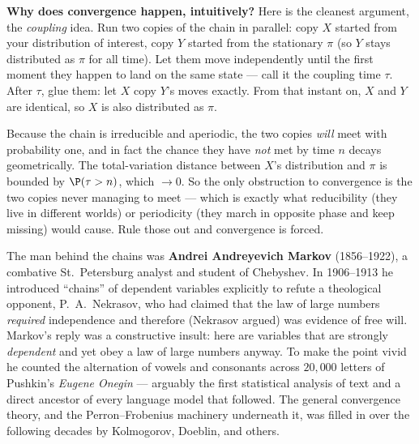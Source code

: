 \begin{whybox}
\textbf{Why does convergence happen, intuitively?} Here is the cleanest argument,
the \emph{coupling} idea. Run two copies of the chain in parallel: copy $X$
started from your distribution of interest, copy $Y$ started from the stationary
$\pi$ (so $Y$ stays distributed as $\pi$ for all time). Let them move
independently until the first moment they happen to land on the same state ---
call it the coupling time $\tau$. After $\tau$, glue them: let $X$ copy $Y$'s moves
exactly. From that instant on, $X$ and $Y$ are identical, so $X$ is also
distributed as $\pi$.

Because the chain is irreducible and aperiodic, the two copies \emph{will} meet
with probability one, and in fact the chance they have \emph{not} met by time $n$
decays geometrically. The total-variation distance between $X$'s distribution and
$\pi$ is bounded by $\P(\tau > n)$, which $\to 0$. So the only obstruction to
convergence is the two copies never managing to meet --- which is exactly what
reducibility (they live in different worlds) or periodicity (they march in
opposite phase and keep missing) would cause. Rule those out and convergence is
forced.
\end{whybox}

\begin{historybox}
The man behind the chains was \textbf{Andrei Andreyevich Markov} (1856--1922), a
combative St.\ Petersburg analyst and student of Chebyshev. In 1906--1913 he
introduced ``chains'' of dependent variables explicitly to refute a theological
opponent, P.\ A.\ Nekrasov, who had claimed that the law of large numbers
\emph{required} independence and therefore (Nekrasov argued) was evidence of free
will. Markov's reply was a constructive insult: here are variables that are
strongly \emph{dependent} and yet obey a law of large numbers anyway. To make the
point vivid he counted the alternation of vowels and consonants across
$20{,}000$ letters of Pushkin's \emph{Eugene Onegin} --- arguably the first
statistical analysis of text and a direct ancestor of every language model that
followed. The general convergence theory, and the Perron--Frobenius machinery
underneath it, was filled in over the following decades by Kolmogorov, Doeblin,
and others.
\end{historybox}

